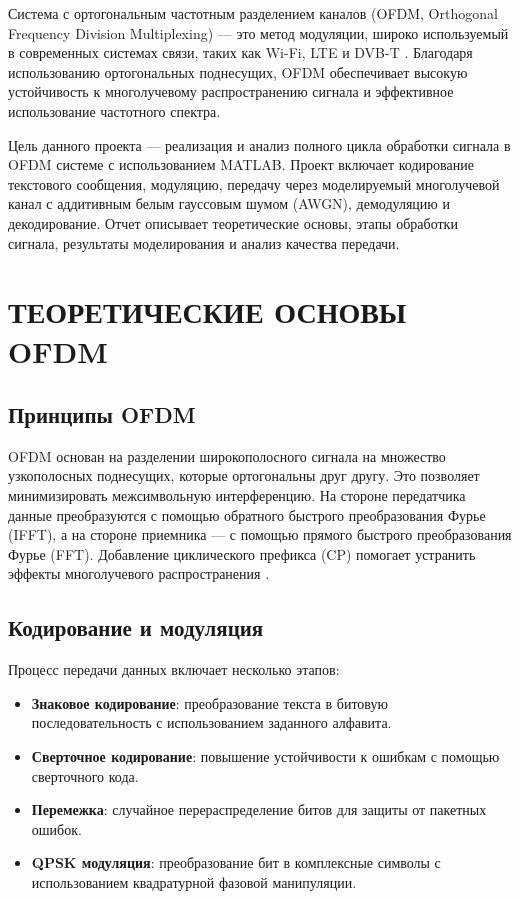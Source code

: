 \documentclass[a4paper,14pt,oneside,openany]{memoir}
\begin{document}
	Система с ортогональным частотным разделением каналов (OFDM, Orthogonal Frequency Division Multiplexing) --- это метод модуляции, широко используемый в современных системах связи, таких как Wi-Fi, LTE и DVB-T \cite{vanNee2000}. Благодаря использованию ортогональных поднесущих, OFDM обеспечивает высокую устойчивость к многолучевому распространению сигнала и эффективное использование частотного спектра.
	
	Цель данного проекта --- реализация и анализ полного цикла обработки сигнала в OFDM системе с использованием MATLAB. Проект включает кодирование текстового сообщения, модуляцию, передачу через моделируемый многолучевой канал с аддитивным белым гауссовым шумом (AWGN), демодуляцию и декодирование. Отчет описывает теоретические основы, этапы обработки сигнала, результаты моделирования и анализ качества передачи.
	
	\chapter{ТЕОРЕТИЧЕСКИЕ ОСНОВЫ OFDM}
	
	\section{Принципы OFDM}
	
	OFDM основан на разделении широкополосного сигнала на множество узкополосных поднесущих, которые ортогональны друг другу. Это позволяет минимизировать межсимвольную интерференцию. На стороне передатчика данные преобразуются с помощью обратного быстрого преобразования Фурье (IFFT), а на стороне приемника --- с помощью прямого быстрого преобразования Фурье (FFT). Добавление циклического префикса (CP) помогает устранить эффекты многолучевого распространения \cite{oppenheim1999}.
	
	\section{Кодирование и модуляция}
	
	Процесс передачи данных включает несколько этапов:
	\begin{itemize}
		\item \textbf{Знаковое кодирование}: преобразование текста в битовую последовательность с использованием заданного алфавита.
		\item \textbf{Сверточное кодирование}: повышение устойчивости к ошибкам с помощью сверточного кода.
		\item \textbf{Перемежка}: случайное перераспределение битов для защиты от пакетных ошибок.
		\item \textbf{QPSK модуляция}: преобразование бит в комплексные символы с использованием квадратурной фазовой манипуляции.
	\end{itemize}
	
\end{document}
